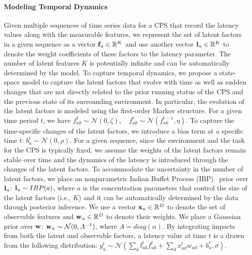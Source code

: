 \documentclass[11pt]{proposalnsf}
\newlength\q %
\begin{document}
\begin{sloppypar}
\vspace{-2mm}\paragraph{Modeling Temporal Dynamics} Given multiple sequences of time series data for a CPS that record the latency values along with the measurable features, we represent the set of latent factors in a given sequence as a vector ${\bf f}_u \in \mathbb{R}^K$ and use another vector ${\bf l}_u \in \mathbb{R}^K$ to denote the weight coefficients of these factors to the latency parameter. The number of latent features $K$ is potentially infinite and can be automatically determined by the model. To capture temporal dynamics, we propose a state-space model to capture the latent factors that evolve with time as well as sudden changes that are not directly related to the prior running status of the CPS and the previous state of its surrounding environment. In particular, the evolution of the latent factors is modeled using the first-order Markov structure. For a given time period $t$, we have $f_{uk}^1 \sim \mathcal{N}(0,\zeta), \quad f_{uk}^t \sim \mathcal{N}(f_{uk}^{t-1},\eta)$.
To capture the time-specific changes of the latent factors, we introduce a bias term at a specific time $t$: $b_u^t \sim \mathcal{N}(0,\rho)$.
For a given sequence, since the environment and the task for the CPS is typically fixed, we assume the weights of the latent factors remain stable over time and the dynamics of the latency is introduced through the changes of the latent factors. To accommodate the uncertainty in the number of latent factors, we place an nonparametric Indian Buffet Process (IBP)~\cite{ghahramani2006infinite} prior over 
${\bf l}_u$: ${\bf l}_u \sim IBP(a)$,
where $a$ is the concentration parameters that control the size of the latent factors (i.e., $K$) and it can be automatically determined by the data through posterior inference. We use a vector ${\bf x}_u \in \mathbb{R}^D$ to denote the set of observable features and ${\bf w}_u \in \mathbb{R}^D$ to denote their weights. We place a Gaussian prior over ${\bf w}$: ${\bf w}_u \sim \mathcal{N} (0,A^{-1})$, where $A=diag(\alpha)$.
By integrating impacts from both the latent and observable factors, a latency value at time $t$ is a drawn from the following distribution: $y^t_u \sim \mathcal{N}(\sum_k l^t_{uk} f_{uk}^t+\sum_d x_{ud}^tw_{ud}+b_u^t,\sigma)$.


\end{sloppypar}
\end{document}

